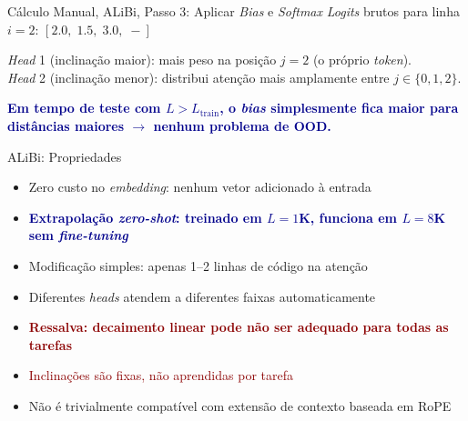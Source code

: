 \documentclass[aspectratio=169, xcolor=dvipsnames]{beamer}
\begin{document}
  \begin{frame}{Cálculo Manual, ALiBi, Passo 3: Aplicar \textit{Bias} e \textit{Softmax}}
    \textit{Logits} brutos para linha $i{=}2$: \; $[2.0,\; 1.5,\; 3.0,\; -]$

    \vspace{0.3em}

    \vspace{0.5em}
    \textit{Head} 1 (inclinação maior): mais peso na posição $j{=}2$ (o próprio \textit{token}).\\
    \textit{Head} 2 (inclinação menor): distribui atenção mais amplamente entre $j \in \{0,1,2\}$.

    \vspace{0.3em}
    \textcolor{DarkBlue}{\textbf{Em tempo de teste com $L > L_{\text{train}}$, o \textit{bias} simplesmente fica maior para distâncias maiores $\to$ nenhum problema de OOD.}}
  \end{frame}

  \begin{frame}{ALiBi: Propriedades}
    \begin{itemize}
      \item Zero custo no \textit{embedding}: nenhum vetor adicionado à entrada
      \item \textcolor{DarkBlue}{\textbf{Extrapolação \textit{zero-shot}: treinado em $L{=}1$K, funciona em $L{=}8$K sem \textit{fine-tuning}}}
      \item Modificação simples: apenas 1--2 linhas de código na atenção
      \item Diferentes \textit{heads} atendem a diferentes faixas automaticamente
      \item \textcolor{DarkRed}{\textbf{Ressalva: decaimento linear pode não ser adequado para todas as tarefas}}
      \item \textcolor{DarkRed}{Inclinações são fixas, não aprendidas por tarefa}
      \item Não é trivialmente compatível com extensão de contexto baseada em RoPE
    \end{itemize}
  \end{frame}
\end{document}
